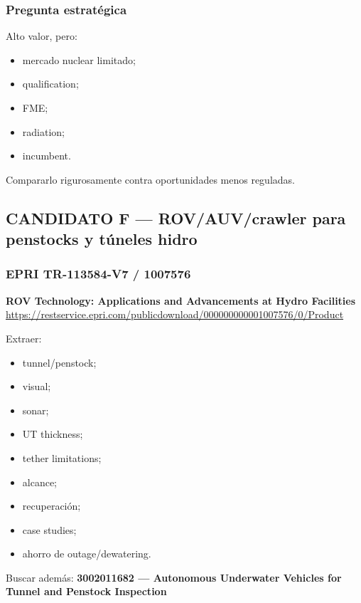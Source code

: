 \documentclass[11pt,a4paper]{article}
\begin{document}
\subsubsection*{Pregunta estratégica}
Alto valor, pero:

\begin{itemize}
\item mercado nuclear limitado;
\item qualification;
\item FME;
\item radiation;
\item incumbent.
\end{itemize}

Compararlo rigurosamente contra oportunidades menos reguladas.


\subsection*{CANDIDATO F — ROV/AUV/crawler para penstocks y túneles hidro}

\subsubsection*{EPRI TR-113584-V7 / 1007576}
\textbf{ROV Technology: Applications and Advancements at Hydro Facilities} \\
\url{https://restservice.epri.com/publicdownload/000000000001007576/0/Product}

Extraer:

\begin{itemize}
\item tunnel/penstock;
\item visual;
\item sonar;
\item UT thickness;
\item tether limitations;
\item alcance;
\item recuperación;
\item case studies;
\item ahorro de outage/dewatering.
\end{itemize}

Buscar además:
\textbf{3002011682 — Autonomous Underwater Vehicles for Tunnel and Penstock Inspection}
\end{document}

